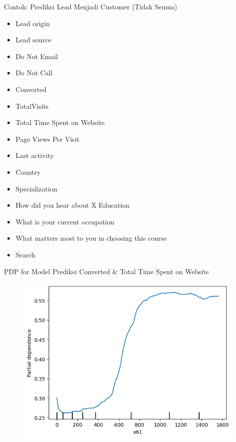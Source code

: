 \documentclass[aspectratio=169]{beamer}
\begin{document}
\begin{frame}{Contoh: Prediksi Lead Menjadi Customer (Tidak Semua)}
	\begin{multicols}{2} 
		\begin{itemize}
			\item  \footnotesize Lead origin
			\item  \footnotesize Lead source
			\item  \footnotesize Do Not Email
			\item  \footnotesize Do Not Call
			\item  \footnotesize Converted
			\item  \footnotesize TotalVisits
			\item  \footnotesize Total Time Spent on Website
		\end{itemize}
		\columnbreak
		\begin{itemize}
			\item  \footnotesize Page Views Per Visit
			\item  \footnotesize Last activity
			\item  \footnotesize Country
			\item  \footnotesize Specialization
			\item  \footnotesize How did you hear about X Education
			\item  \footnotesize What is your current occupation
			\item  \footnotesize What matters most to you in choosing this course
			\item  \footnotesize Search
		\end{itemize}
	\end{multicols}
\end{frame}

\begin{frame}{PDP for Model Prediksi Converted \& Total Time Spent on Website}
		\begin{figure}[!ht]
		\centering
		\includegraphics[scale=.55]{images/pdp-leads-1}
	\end{figure}
\end{frame}
\end{document}
